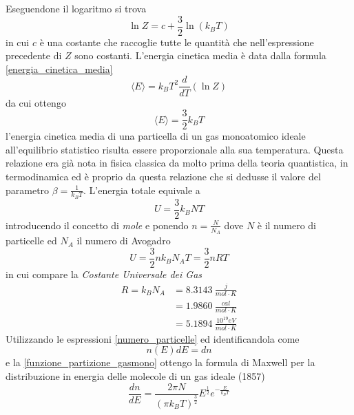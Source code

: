 Eseguendone il logaritmo si trova
\begin{equation}
\ln Z = c + \frac{3}{2} \ln (k_B T)
\end{equation}
in cui $c$ è una costante che raccoglie tutte le quantità che nell'espressione precedente di $Z$ sono costanti.
L'energia cinetica media è data dalla formula \ref{energia_cinetica_media}
\begin{equation}
\langle E \rangle = k_B T^2 \frac{d}{dT} (\ln Z)
\end{equation}
da cui ottengo
\begin{equation}
\langle E \rangle = \frac{3}{2} k_B T
\end{equation}
l'energia cinetica media di una particella di un gas monoatomico ideale all'equilibrio statistico risulta essere proporzionale alla sua temperatura.
Questa relazione era già nota in fisica classica da molto prima della teoria quantistica, in termodinamica ed è proprio da questa relazione che si dedusse il valore del parametro $\beta = \frac{1}{k_B T}$.
L'energia totale equivale a
\begin{equation}
U = \frac{3}{2} k_B N T
\end{equation}
introducendo il concetto di \textit{mole} e ponendo $n = \frac{N}{N_A}$ dove $N$ è il numero di particelle ed $N_A$ il numero di Avogadro
\begin{equation}
U = \frac{3}{2} n k_B N_A T = \frac{3}{2} n R T
\end{equation}
in cui compare la \textit{Costante Universale dei Gas}
\begin{equation}
\begin{split}
R = k_B N_A & = \SI{8.3143}{\frac{j}{mol \cdot K}} \\
& = \SI{1.9860}{\frac{cal}{mol \cdot K}} \\
& = \SI{5.1894}{\frac{10^{19 } eV }{mol \cdot K}}
\end{split}
\end{equation}
Utilizzando le espressioni \ref{numero_particelle} ed identificandola come
\begin{equation}
n(E) dE = d n
\end{equation}
e la \ref{funzione_partizione_gasmono}
ottengo la formula di Maxwell per la distribuzione in energia delle molecole di un gas ideale (1857)
\begin{equation}
\frac{dn}{dE} = \frac{2\pi N}{(\pi k_B T)^{ \frac{3}{2} }} E^{ \frac{1}{2} } e^{ - \frac{E}{k_B T} }
\end{equation}

